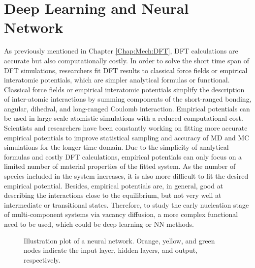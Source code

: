 \section{Deep Learning and Neural Network}
\label{Chap:Mech:NN}

As previously mentioned in Chapter \ref{Chap:Mech:DFT}, \ac{DFT} calculations are accurate but also computationally costly. In order to solve the short time span of \ac{DFT} simulations, researchers fit \ac{DFT} results to classical force fields or empirical interatomic potentials, which are simpler analytical formulas or functional. Classical force fields or empirical interatomic potentials simplify the description of inter-atomic interactions by summing components of the short-ranged bonding\cite{jones1924determination}, angular\cite{justo1998interatomic}, dihedral\cite{cornell1995second}, and long-ranged Coulomb interaction\cite{liang2013classical}. Empirical potentials can be used in large-scale atomistic simulations with a reduced computational cost. Scientists and researchers have been constantly working on fitting more accurate empirical potentials to improve statistical sampling and accuracy of \ac{MD} and \ac{MC} simulations for the longer time domain. Due to the simplicity of analytical formulas and costly \ac{DFT} calculations, empirical potentials can only focus on a limited number of material properties of the fitted system. As the number of species included in the system increases, it is also more difficult to fit the desired empirical potential. Besides, empirical potentials are, in general, good at describing the interactions close to the equilibrium, but not very well at intermediate or transitional states. Therefore, to study the early nucleation stage of multi-component systems via vacancy diffusion, a more complex functional need to be used, which could be deep learning or \ac{NN} methods.

\begingroup
\begin{figure}[!ht]
  \centering
  \caption[Illustration plot of a neural network.]{Illustration plot of a neural network. Orange, yellow, and green nodes indicate the input layer, hidden layers, and output, respectively.}
  \label{Chap:Meth:NN:fig1}
\end{figure}
\endgroup

